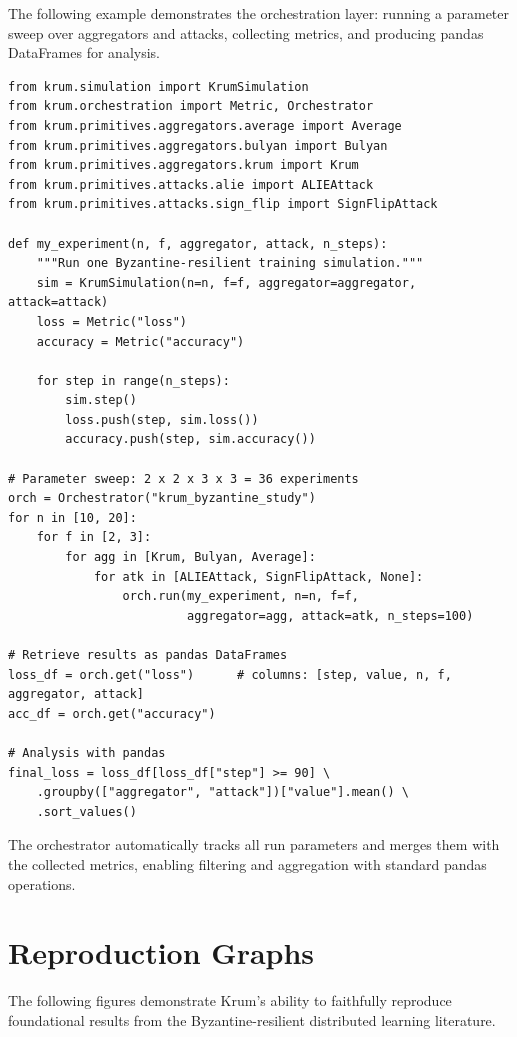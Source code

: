 \documentclass[twoside,11pt]{article}
\begin{document}
The following example demonstrates the orchestration layer: running a parameter sweep over aggregators and attacks, collecting metrics, and producing pandas DataFrames for analysis.

\begin{verbatim}
from krum.simulation import KrumSimulation
from krum.orchestration import Metric, Orchestrator
from krum.primitives.aggregators.average import Average
from krum.primitives.aggregators.bulyan import Bulyan
from krum.primitives.aggregators.krum import Krum
from krum.primitives.attacks.alie import ALIEAttack
from krum.primitives.attacks.sign_flip import SignFlipAttack

def my_experiment(n, f, aggregator, attack, n_steps):
    """Run one Byzantine-resilient training simulation."""
    sim = KrumSimulation(n=n, f=f, aggregator=aggregator, attack=attack)
    loss = Metric("loss")
    accuracy = Metric("accuracy")
    
    for step in range(n_steps):
        sim.step()
        loss.push(step, sim.loss())
        accuracy.push(step, sim.accuracy())

# Parameter sweep: 2 x 2 x 3 x 3 = 36 experiments
orch = Orchestrator("krum_byzantine_study")
for n in [10, 20]:
    for f in [2, 3]:
        for agg in [Krum, Bulyan, Average]:
            for atk in [ALIEAttack, SignFlipAttack, None]:
                orch.run(my_experiment, n=n, f=f,
                         aggregator=agg, attack=atk, n_steps=100)

# Retrieve results as pandas DataFrames
loss_df = orch.get("loss")      # columns: [step, value, n, f, aggregator, attack]
acc_df = orch.get("accuracy")

# Analysis with pandas
final_loss = loss_df[loss_df["step"] >= 90] \
    .groupby(["aggregator", "attack"])["value"].mean() \
    .sort_values()
\end{verbatim}

The orchestrator automatically tracks all run parameters and merges them with the collected metrics, enabling filtering and aggregation with standard pandas operations.

\section{Reproduction Graphs}
\label{app:example-graphs}

The following figures demonstrate Krum's ability to faithfully reproduce foundational results from the Byzantine-resilient distributed learning literature.
\end{document}
